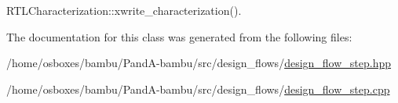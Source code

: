 R\+T\+L\+Characterization\+::xwrite\+\_\+characterization().



The documentation for this class was generated from the following files\+:\begin{DoxyCompactItemize}
\item 
/home/osboxes/bambu/\+Pand\+A-\/bambu/src/design\+\_\+flows/\hyperlink{design__flow__step_8hpp}{design\+\_\+flow\+\_\+step.\+hpp}\item 
/home/osboxes/bambu/\+Pand\+A-\/bambu/src/design\+\_\+flows/\hyperlink{design__flow__step_8cpp}{design\+\_\+flow\+\_\+step.\+cpp}\end{DoxyCompactItemize}
